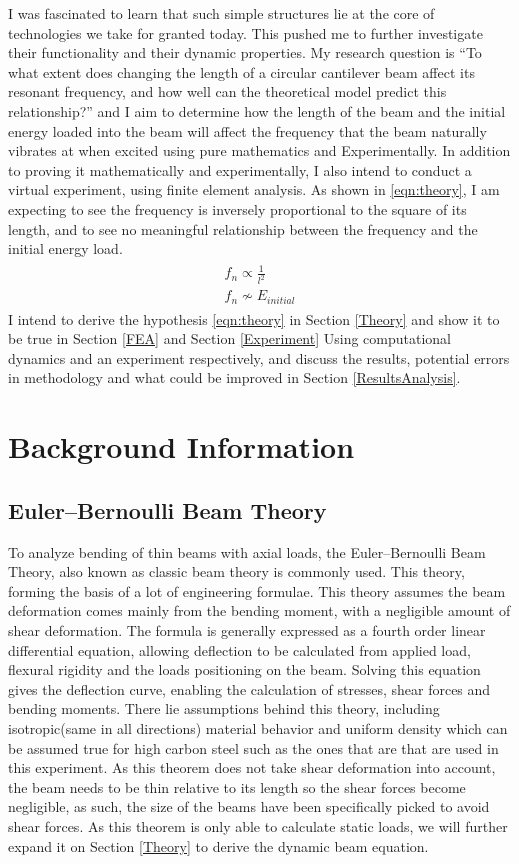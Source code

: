 \documentclass[a4paper,12pt]{article}
\newcommand{\ResearchQ}{To what extent does changing the length of a circular cantilever beam affect its resonant frequency, and how well can the theoretical model predict this relationship?}
\begin{document}
I was fascinated to learn that such simple structures lie at the core of technologies we take for granted today. This pushed me to further investigate their functionality and their dynamic properties. My research question is ``\ResearchQ'' and
I aim to determine how the length of the beam and the initial energy loaded into the beam will affect the frequency that the beam naturally vibrates at when excited using pure mathematics and Experimentally.
In addition to proving it mathematically and experimentally, I also intend to conduct a virtual experiment, using finite element analysis.
As shown in \eqref{eqn:theory}, I am expecting to see the frequency is inversely proportional to the square of its length, and to see no meaningful relationship between the frequency and the initial energy load.
\begin{align}%
\label{eqn:theory}
\begin{split}
f_{n}\propto \frac{1}{l^{2}}
\\
f_{n}\not\sim E_{initial}
\end{split}
\end{align}
I intend to derive the hypothesis \eqref{eqn:theory} in Section \ref{Theory} and show it to be true in Section \ref{FEA} and Section \ref{Experiment} Using computational dynamics and an experiment respectively, and discuss the results, potential errors in methodology and what could be improved in Section \ref{ResultsAnalysis}.

\section{Background Information}%
    \subsection{Euler–Bernoulli Beam Theory}\label{BeamTheory}%
    To analyze bending of thin beams with axial loads, the Euler–Bernoulli Beam Theory, also known as classic beam theory is commonly used.
    This theory, forming the basis of a lot of engineering formulae. This theory assumes the beam deformation comes mainly from the bending moment, with a negligible amount of shear deformation. The formula is generally expressed as a fourth order linear differential equation, allowing deflection to be calculated from applied load, flexural rigidity and the loads positioning on the beam. Solving this equation gives the deflection curve, enabling the calculation of stresses, shear forces and bending moments.\autocite{EngMechanics}
    There lie assumptions behind this theory, including isotropic(same in all directions) material behavior and uniform density which can be assumed true for high carbon steel such as the ones that are that are used in this experiment.\autocite{EngMechanics}
    As this theorem does not take shear deformation into account, the beam needs to be thin relative to its length so the shear forces become negligible, as such, the size of the beams have been specifically picked to avoid shear forces.
    As this theorem is only able to calculate static loads, we will further expand it on Section \ref{Theory} to derive the dynamic beam equation.
\end{document}

